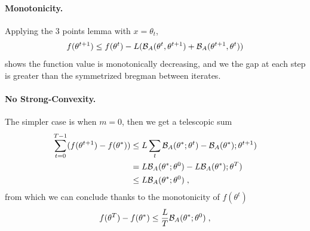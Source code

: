 \documentclass{article}
\newcommand{\logpart}{A}
\newcommand{\bregman}{\cB_\logpart}
\newcommand{\nat}{\theta}
\begin{document}
\paragraph{Monotonicity.}
Applying the 3 points lemma with $x=\nat_t$, 
\begin{align}
	f(\nat^{t+1}) \leq  f(\nat^t) -L (\bregman(\nat^{t}, \nat^{t+1}) + \bregman(\nat^{t+1} , \nat^{t} ))
\end{align}
shows the function value is monotonically decreasing, and we the gap at each step is greater than the symmetrized bregman between iterates. 

\paragraph{No Strong-Convexity.}
The simpler case is when $m=0$, then we get a telescopic sum
\begin{align}
	\sum_{t=0}^{T-1} (f(\nat^{t+1}) - f(\nat^*)) 
	&\leq L \sum_t \bregman(\nat^{*}; \nat^{t}) - \bregman(\nat^{*}); \nat^{t+1}) \\
	&= L \bregman(\nat^{*}; \nat^{0}) - L\bregman(\nat^{*}); \nat^{T})\\
	&\leq L \bregman(\nat^{*}; \nat^{0}) \; ,
\end{align}
from which we can conclude thanks to the monotonicity of $f(\nat^t)$
\begin{align}
	f(\nat^{T}) - f(\nat^*)
	\leq  \frac{L}{T} \bregman(\nat^{*}; \nat^{0}) \; ,
\end{align}
\end{document}
